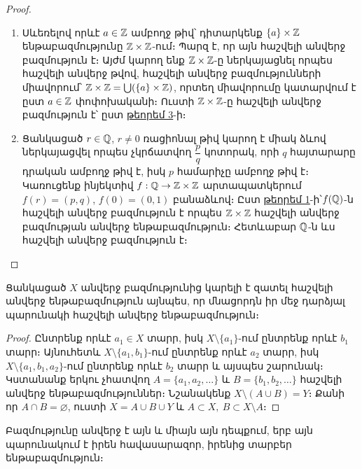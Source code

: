 \documentclass[./main.tex]{subfiles}
\begin{document}
\begin{proof}
\begin{enumerate}
    \item[ա)] Սևեռելով որևէ $a\in \mathbb{Z}$ ամբողջ թիվ՝ դիտարկենք $\{a\}\times\mathbb{Z}$ ենթաբազմությունը $\mathbb{Z}\times \mathbb{Z}$-ում։ Պարզ է, որ այն հաշվելի անվերջ բազմություն է։ Այժմ կարող ենք $\mathbb{Z}\times \mathbb{Z}$-ը ներկայացնել որպես հաշվելի անվերջ թվով, հաշվելի անվերջ բազմությունների միավորում՝ $\mathbb{Z}\times \mathbb{Z}= \bigcup\limits (\{a\}\times \mathbb{Z})$, որտեղ միավորումը կատարվում է ըստ $a \in \mathbb{Z}$ փոփոխականի։ Ուստի $\mathbb{Z}\times\mathbb{Z}$-ը հաշվելի անվերջ բազմություն է՝ ըստ \hyperref[ch3thm3]{թեորեմ 3}-ի։
    \item[բ)] Ցանկացած $r\in \mathbb{Q}$, $r\neq 0$ ռացիոնալ թիվ կարող է միակ ձևով ներկայացվել որպես չկրճատվող $\dfrac{p}{q}$ կոտորակ, որի $q$ հայտարարը դրական ամբողջ թիվ է, իսկ $p$ համարիչը ամբողջ թիվ է։ Կառուցենք ինյեկտիվ $f:\mathbb{Q}\rightarrow \mathbb{Z}\times\mathbb{Z}$ արտապատկե\-րում $f(r)=(p,q)$, $f(0)=(0,1)$ բանաձևով։ Ըստ {\hyperref[ch3thm1]{թեորեմ 1}-ի՝}\linebreak  $f(\mathbb{Q})$-ն հաշվելի անվերջ բազմություն է որպես $\mathbb{Z}\times \mathbb{Z}$ հաշվելի անվերջ բազմու\-թյան անվերջ ենթաբազմու\-թյուն։ Հետևաբար $\mathbb{Q}$-ն ևս հաշվելի անվերջ բազ\-մու\-թյուն է։ \qedhere
\end{enumerate}
\end{proof}

\begin{theorem}\label{ch3thm4}
Ցանկացած $X$ անվերջ բազմությունից կարելի է զատել հաշվելի անվերջ ենթաբազմություն այնպես, որ մնացորդն իր մեջ դարձյալ պարունակի հաշվելի անվերջ ենթաբազմություն։
\end{theorem}

\begin{proof}
Ընտրենք որևէ $a_1\in X$ տարր, իսկ $X\setminus \{a_1\}$-ում ընտրենք որևէ $b_1$ տարր։ Այնուհետև $X\setminus \{a_1,b_1\}$-ում ընտրենք որևէ $a_2$ տարր, իսկ $X\setminus\{a_1,b_1,a_2\}$-ում ընտրենք որևէ $b_2$ տարր և այսպես շարունակ։ Կստանանք երկու չհատվող $A=\{a_1,a_2,\dots\}$ և $B=\{b_1,b_2,\dots\}$ հաշվելի անվերջ ենթաբազմություններ։ Նշանակենք $X\setminus (A\cup B)=Y$։ Քանի որ $A\cap B = \varnothing$, ուստի $X=A\cup  B\cup  Y$ և $A\subset X,\ B\subset X\setminus A$։
\end{proof}

\begin{theorem}\label{ch3thm5}
Բազմությունը անվերջ է այն և միայն այն դեպքում, երբ այն պարու\-նա\-կում է իրեն հավասարազոր, իրենից տարբեր ենթաբազմություն։
\end{theorem}
\end{document}
